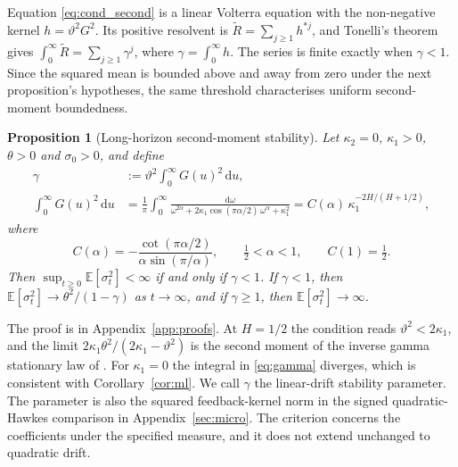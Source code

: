 \documentclass{rQUF2e}
\theoremstyle{plain}
\newtheorem{proposition}[theorem]{Proposition}
\theoremstyle{definition}
\theoremstyle{remark}
\newcommand{\D}{\mathrm{d}}
\newcommand{\E}{\mathbb{E}}
\begin{document}
Equation \eqref{eq:cond_second} is a linear Volterra equation with the non-negative kernel $h=\vartheta^2G^2$. Its positive resolvent is $\widetilde R=\sum_{j\ge1}h^{*j}$, and Tonelli's theorem gives $\int_0^\infty\widetilde R=\sum_{j\ge1}\gamma^j$, where $\gamma=\int_0^\infty h$. The series is finite exactly when $\gamma<1$. Since the squared mean is bounded above and away from zero under the next proposition's hypotheses, the same threshold characterises uniform second-moment boundedness.

\begin{proposition}[Long-horizon second-moment stability]\label{prop:stationarity}
Let $\kappa_2=0$, $\kappa_1>0$, $\theta>0$ and $\sigma_0>0$, and define
\begin{equation}\label{eq:gamma}
\begin{split}
\gamma&:=\vartheta^2\int_0^\infty G(u)^2\,\D u,\\
\int_0^\infty G(u)^2\,\D u&=\frac1\pi\int_0^\infty\frac{\D\omega}{\omega^{2\alpha}+2\kappa_1\cos(\pi\alpha/2)\,\omega^\alpha+\kappa_1^2}=C(\alpha)\,\kappa_1^{-2H/(H+1/2)},
\end{split}
\end{equation}
where
\begin{equation*}
C(\alpha)=-\frac{\cot(\pi\alpha/2)}{\alpha\sin(\pi/\alpha)},\qquad \tfrac12<\alpha<1,\qquad C(1)=\tfrac12.
\end{equation*}
Then $\sup_{t\ge0}\E[\sigma_t^2]<\infty$ if and only if $\gamma<1$. If $\gamma<1$, then $\E[\sigma_t^2]\to\theta^2/(1-\gamma)$ as $t\to\infty$, and if $\gamma\ge1$, then $\E[\sigma_t^2]\to\infty$.
\end{proposition}

The proof is in Appendix~\ref{app:proofs}. At $H=1/2$ the condition reads $\vartheta^2<2\kappa_1$, and the limit $2\kappa_1\theta^2/(2\kappa_1-\vartheta^2)$ is the second moment of the inverse gamma stationary law of \citet{SeppRakhmonov2023}. For $\kappa_1=0$ the integral in \eqref{eq:gamma} diverges, which is consistent with Corollary~\ref{cor:ml}. We call $\gamma$ the linear-drift stability parameter. The parameter is also the squared feedback-kernel norm in the signed quadratic-Hawkes comparison in Appendix~\ref{sec:micro}. The criterion concerns the coefficients under the specified measure, and it does not extend unchanged to quadratic drift.
\end{document}

